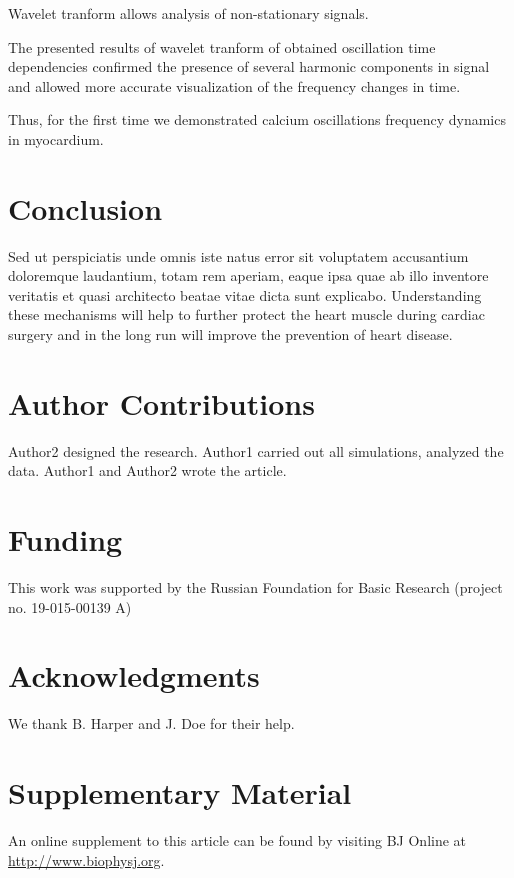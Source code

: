 \documentclass{biophys-new}
\begin{document}
Wavelet tranform allows analysis of non-stationary signals.

The presented results of wavelet tranform of obtained oscillation time dependencies confirmed the presence of several harmonic components in signal
and allowed more accurate visualization of the frequency changes in time.

Thus, for the first time we demonstrated calcium oscillations frequency dynamics in myocardium.

\section*{Conclusion}
Sed ut perspiciatis unde omnis iste natus error sit voluptatem accusantium doloremque laudantium, totam rem aperiam, eaque ipsa quae ab illo inventore veritatis et quasi architecto beatae vitae dicta sunt explicabo.
Understanding these mechanisms will help to further protect the heart muscle during cardiac surgery and in the long run will improve the prevention of heart disease.

\section*{Author Contributions}
Author2 designed the research. Author1 carried out all simulations, analyzed the data. Author1 and Author2 wrote the article.

\section*{Funding}
This work was supported by the Russian Foundation for Basic Research (project no. 19-015-00139 A)

\section*{Acknowledgments}
We thank B. Harper and J. Doe for their help.




\section*{Supplementary Material}
An online supplement to this article can be found by visiting BJ Online at \url{http://www.biophysj.org}.

\subsection*{}\label{github}
\end{document}
